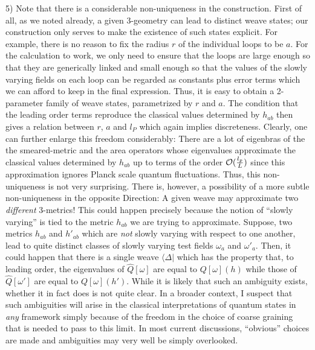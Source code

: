 \item{5)} {Note that there is a considerable non-uniqueness in the
construction. First of all, as we noted already, a given 3-geometry can lead
to distinct weave states; our construction only serves to make the existence
of such states explicit. For example, there is no reason to fix the radius
$r$ of the individual loops to be $a$. For the calculation to work, we only
need to ensure that the loops are large enough so that they are generically
linked and small enough so that the values of the slowly varying fields on
each loop can be regarded as constants plus error terms which we can afford to
keep in the final expression. Thus, it is easy to obtain a 2-parameter family
of weave states, parametrized by $r$ and $a$. The condition that the leading
order terms reproduce the classical values determined by $h_{ab}$ then gives
a relation between $r$, $a$ and $l_P$ which again implies discreteness.
Clearly, one can further enlarge this freedom considerably: There are a lot
of eigenbras of the the smeared-metric and the area operators whose
eigenvalues approximate the classical values determined by $h_{ab}$ up to
terms of the order ${\cal O}({l_p \over L})$ since this approximation ignores
Planck scale quantum fluctuations. Thus, this non-uniqueness is not very
surprising. There is, however, a possibility of a more subtle non-uniqueness
in the opposite Direction: A given weave may approximate two {\it different}
3-metrics! This could happen precisely because the notion of ``slowly
varying'' is tied to the metric $h_{ab}$ we are trying to approximate.
Suppose, two metrics $h_{ab}$ and $h'_{ab}$ which are {\it not} slowly varying
with respect to one another, lead to quite distinct classes of slowly varying
test fields $\omega_a$ and $\omega'_a$. Then, it could happen that there is
a single weave $\langle\Delta|$ which has the property that, to leading order,
the eigenvalues of $\hat{Q}[\omega ]$ are equal to $Q[\omega ](h)$ while
those of $\hat{Q}[\omega']$ are equal to $Q[\omega ](h')$. While it is likely
that such an ambiguity exists, whether it in fact does is not quite clear.
In a broader context, I suspect that such ambiguities will arise in the
classical interpretations of quantum states in {\it any} framework simply
because of the freedom in the choice of coarse graining that is needed to
pass to this limit. In most current discussions, ``obvious'' choices are made
and ambiguities may very well be simply overlooked.}

